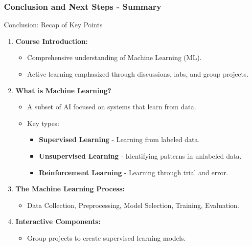 \documentclass[aspectratio=169]{beamer}
\begin{document}
\begin{frame}[fragile]
  \frametitle{Conclusion and Next Steps - Summary}
  \begin{block}{Conclusion: Recap of Key Points}
    \begin{enumerate}
      \item \textbf{Course Introduction:}
      \begin{itemize}
        \item Comprehensive understanding of Machine Learning (ML).
        \item Active learning emphasized through discussions, labs, and group projects.
      \end{itemize}
      
      \item \textbf{What is Machine Learning?}
      \begin{itemize}
        \item A subset of AI focused on systems that learn from data.
        \item Key types:
        \begin{itemize}
          \item \textbf{Supervised Learning} - Learning from labeled data.
          \item \textbf{Unsupervised Learning} - Identifying patterns in unlabeled data.
          \item \textbf{Reinforcement Learning} - Learning through trial and error.
        \end{itemize}
      \end{itemize}
      
      \item \textbf{The Machine Learning Process:}
      \begin{itemize}
        \item Data Collection, Preprocessing, Model Selection, Training, Evaluation.
      \end{itemize}
      
      \item \textbf{Interactive Components:}
      \begin{itemize}
        \item Group projects to create supervised learning models.
      \end{itemize}
    \end{enumerate}
  \end{block}
\end{frame}
\end{document}
